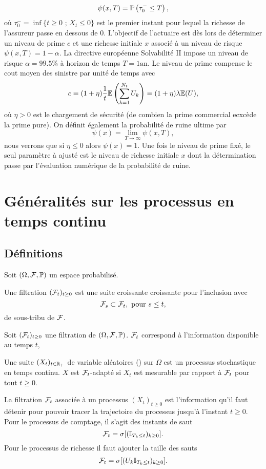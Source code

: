 $$
\psi(x,T) = \mathbb{P}\left(\tau_0^-\leq T\right),
$$
où $\tau_0^- = \inf\{t\geq 0\text{ ; }X_t\leq0\}$ est le premier instant pour lequel la richesse de l'assureur passe en dessous de $0$. L'objectif de l'actuaire est dès lors de déterminer un niveau de prime $c$ et une richesse initiale $x$ associé à un niveau de risque $\psi(x,T) = 1-\alpha$. La directive européenne Solvabilité II impose un niveau de risque $\alpha = 99.5\%$ à horizon de temps $T= 1 \text{an}$. Le niveau de prime compense le cout moyen des sinistre par unité de temps avec 
$$
c = (1+\eta)\frac{1}{t}\mathbb{E}\left(\sum_{k=1}^{N_t}U_k\right) = (1+\eta)\lambda\mathbb{E}(U),
$$
où $\eta>0$ est le chargement de sécurité (de combien la prime commercial ecxcède la prime pure). On définit également la probabilité de ruine ultime par 
$$
\psi(x) = \underset{T\rightarrow \infty}{\lim} \psi(x,T),
$$
nous verrons que si $\eta \leq 0$ alors $\psi(x) = 1$. Une fois le niveau de prime fixé, le seul paramètre à ajusté est le niveau de richesse initiale $x$ dont la détermination passe par l'évaluation numérique de la probabilité de ruine.
\section{Généralités sur les processus en temps continu}\label{sec:processus_continu}
\subsection{Définitions}\label{ssec:definitions}
Soit $(\Omega, \mathcal{F}, \mathbb{P})$ un espace probabilisé. 
\begin{definition}\label{def:filtration}
Une filtration $(\mathcal{F}_t)_{t\geq0}$ est une suite croissante croissante pour l'inclusion avec
$$
\mathcal{F}_s\subset \mathcal{F}_t,\text{ pour }s\leq t,
$$
de sous-tribu de $\mathcal{F}$.
\end{definition}
Soit $(\mathcal{F}_t)_{t\geq0}$ une filtration de $(\Omega, \mathcal{F}, \mathbb{P})$. $\mathcal{F}_t$ correspond à l'information disponible au temps $t$,
\begin{definition}\label{def:processus}
Une suite $(X_t)_{t\in \mathbb{R}_+}$ de variable aléatoires (\va) sur $\Omega$ est un processus stochastique en temps continu. $X$ est $\mathcal{F}_t$-adapté si $X_t$ est mesurable par rapport à $\mathcal{F}_t$ pour tout $t\geq0$. 
\end{definition}
\begin{remark}
La filtration $\mathcal{F}_t$ associée à un processus $(X_t)_{t\geq 0}$ est l'information qu'il faut détenir pour pouvoir tracer la trajectoire du processus jusqu'à l'instant $t\geq 0$. Pour le processus de comptage, il s'agit des instants de saut 
$$
\mathcal{F}_t = \sigma[(\mathbb{I}_{T_k \leq t})_{k\geq 0}].
$$
Pour le processus de richesse il faut ajouter la taille des sauts
$$
\mathcal{F}_t=\sigma[(U_k\mathbb{I}_{T_k \leq t})_{k\geq 0}].
$$
\end{remark}
